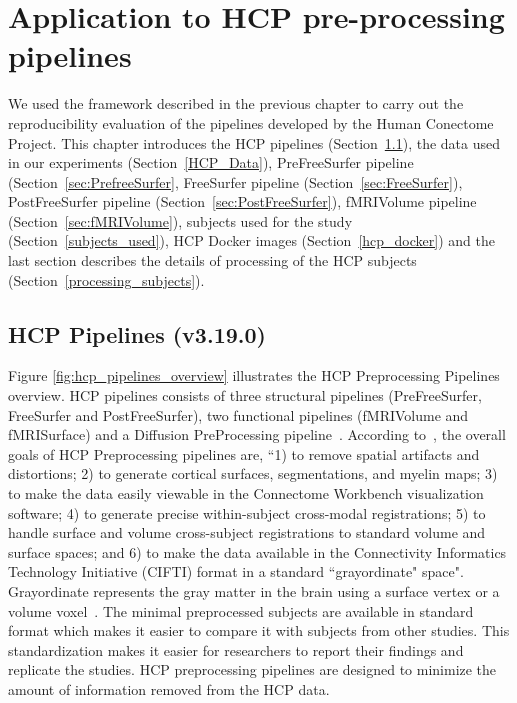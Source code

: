 \chapter{Application to HCP pre-processing pipelines}\label{pipelines}
\setlength{\parskip}{1em}
\setlength{\parindent}{4em}
We used the framework described in the previous chapter to carry out the reproducibility evaluation of the pipelines developed by the Human Conectome Project. This chapter introduces the HCP pipelines (Section~\ref{hcp_pipelines}), the data used in our experiments (Section~\ref{HCP_Data}), PreFreeSurfer pipeline (Section~\ref{sec:PrefreeSurfer}, FreeSurfer pipeline (Section~\ref{sec:FreeSurfer}), PostFreeSurfer pipeline (Section~\ref{sec:PostFreeSurfer}), fMRIVolume pipeline (Section~\ref{sec:fMRIVolume}), subjects used for the study (Section~\ref{subjects_used}), HCP Docker images (Section~\ref{hcp_docker}) and the last section describes the details of processing of the HCP subjects (Section~\ref{processing_subjects}).

\section{HCP Pipelines (v3.19.0)} \label{hcp_pipelines}
Figure \ref{fig:hcp_pipelines_overview} illustrates the HCP Preprocessing Pipelines overview. HCP pipelines consists of three structural pipelines (PreFreeSurfer, FreeSurfer and PostFreeSurfer), two functional pipelines (fMRIVolume and fMRISurface) and a Diffusion PreProcessing pipeline~\cite{Gla13}. According to~\cite{Gla13}, the overall goals of HCP Preprocessing pipelines are, ``1) to remove spatial artifacts and distortions; 2) to generate cortical surfaces, segmentations, and myelin maps; 3) to make the data easily viewable in the Connectome Workbench visualization software; 4) to generate precise within-subject cross-modal registrations; 5) to handle surface and volume cross-subject registrations to standard volume and surface spaces; and 6) to make the data available in the Connectivity Informatics Technology Initiative (CIFTI) format in a standard ``grayordinate" space". Grayordinate represents the gray matter in the brain using a surface vertex or a volume voxel~\cite{Grayordinate}. The minimal preprocessed subjects are available in standard format which makes it easier to compare it with subjects from other studies. This standardization makes it easier for researchers to report their findings and replicate the studies. HCP preprocessing pipelines are designed to minimize the amount of information removed from the HCP data.

